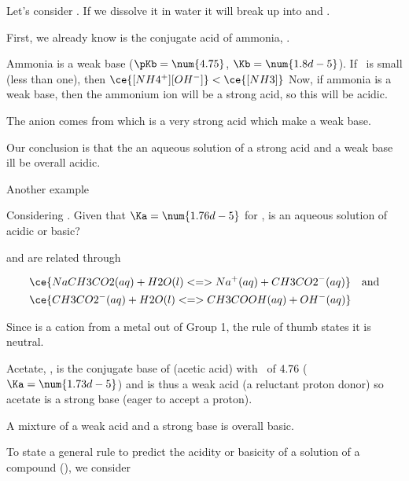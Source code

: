 \documentclass[../mit-general-chemistry.tex]{subfiles}
\begin{document}
\begin{example}
  Let's consider . If we dissolve it in water it will break
  up into  and .


  First, we already know  is the conjugate acid of ammonia,
  .


  Ammonia is a weak base ($\pKb = \num{4.75}$, $\Kb =
  \num{1.8d-5}$). If \Kb\ is small (less than one), then
  $\ce{[NH4^+][OH^-]} < \ce{[NH3]}$ Now, if ammonia is a weak base,
  then the ammonium ion will be a strong acid, so this will be acidic.

  The  anion comes from  which is a very strong acid
  which make  a weak base.

  Our conclusion is that the an aqueous solution of a strong acid and
  a weak base ill be overall acidic.
\end{example}

Another example

\begin{example}
  Considering . Given that $\Ka = \num{1.76d-5}$ for
  , is an aqueous solution of  acidic or
  basic?

   and  are related through

  \begin{align*}
    &\ce{NaCH3CO2(aq) + H2O(l) <=> Na^+(aq) + CH3CO2^-(aq)}\quad\text{and}\\
    &\ce{CH3CO2^-(aq) + H2O(l) <=> CH3COOH(aq) + OH^-(aq)}
  \end{align*}
  
  Since  is a cation from a metal out of Group 1, the rule of
  thumb states it is neutral.

  Acetate, , is the conjugate base of 
  (acetic acid) with \pKa\ of \num{4.76} ($\Ka = \num{1.73d-5}$) and
  is thus a weak acid (a reluctant proton donor) so acetate is a
  strong base (eager to accept a proton).

  A mixture of a weak acid and a strong base is overall basic.
\end{example}



To state a general rule to predict the acidity or basicity of a
solution of a compound (), we consider 
\end{document}

